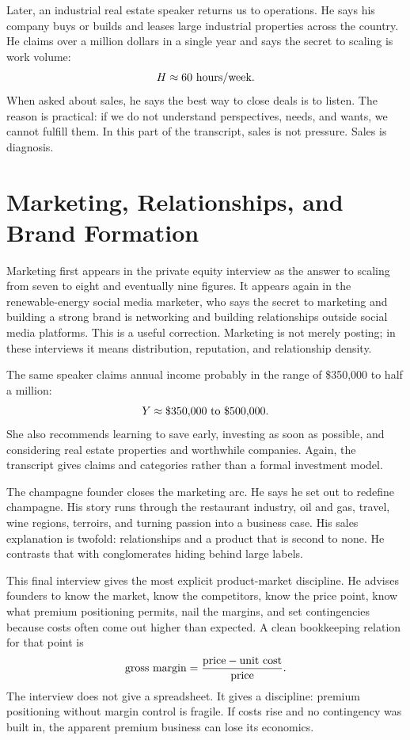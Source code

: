 Later, an industrial real estate speaker returns us to operations. He says his company buys or builds and leases large industrial properties across the country. He claims over a million dollars in a single year and says the secret to scaling is work volume:
\begin{equation}
H\approx 60\ \hbox{hours/week}.
\end{equation}
When asked about sales, he says the best way to close deals is to listen. The reason is practical: if we do not understand perspectives, needs, and wants, we cannot fulfill them. In this part of the transcript, sales is not pressure. Sales is diagnosis.

\section{Marketing, Relationships, and Brand Formation}

Marketing first appears in the private equity interview as the answer to scaling from seven to eight and eventually nine figures. It appears again in the renewable-energy social media marketer, who says the secret to marketing and building a strong brand is networking and building relationships outside social media platforms. This is a useful correction. Marketing is not merely posting; in these interviews it means distribution, reputation, and relationship density.

The same speaker claims annual income probably in the range of \$350,000 to half a million:
\begin{equation}
Y\approx \$350{,}000 \hbox{ to } \$500{,}000.
\end{equation}
She also recommends learning to save early, investing as soon as possible, and considering real estate properties and worthwhile companies. Again, the transcript gives claims and categories rather than a formal investment model.

The champagne founder closes the marketing arc. He says he set out to redefine champagne. His story runs through the restaurant industry, oil and gas, travel, wine regions, terroirs, and turning passion into a business case. His sales explanation is twofold: relationships and a product that is second to none. He contrasts that with conglomerates hiding behind large labels.

This final interview gives the most explicit product-market discipline. He advises founders to know the market, know the competitors, know the price point, know what premium positioning permits, nail the margins, and set contingencies because costs often come out higher than expected. A clean bookkeeping relation for that point is
\begin{equation}
\hbox{gross margin}
=
\frac{\hbox{price}-\hbox{unit cost}}{\hbox{price}}.
\end{equation}
The interview does not give a spreadsheet. It gives a discipline: premium positioning without margin control is fragile. If costs rise and no contingency was built in, the apparent premium business can lose its economics.

